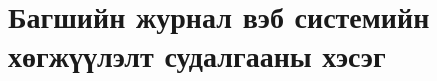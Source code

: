
\chapter{Багшийн журнал вэб системийн хөгжүүлэлт судалгааны хэсэг} 
\label{Chapter1} %


\newcommand{\keyword}[1]{\textbf{#1}}
\newcommand{\tabhead}[1]{\textbf{#1}}
\newcommand{\code}[1]{\texttt{#1}}
\newcommand{\file}[1]{\texttt{\bfseries#1}}
\newcommand{\option}[1]{\texttt{\itshape#1}}


